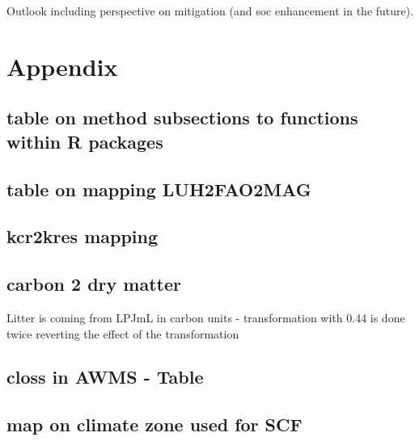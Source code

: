\documentclass[gc, manuscript]{copernicus}
\begin{document}
\conclusions

Outlook including perspective on mitigation (and soc enhancement in the
future). \newpage

\section{Appendix}

\hypertarget{append:subsection2mrfunctions}{%
\subsection{table on method subsections to functions within R
packages}\label{append:subsection2mrfunctions}}

\hypertarget{append:Tableluh2fao2mag}{%
\subsection{table on mapping
LUH2FAO2MAG}\label{append:Tableluh2fao2mag}}

\hypertarget{append:Tablekcr2kres}{%
\subsection{kcr2kres mapping}\label{append:Tablekcr2kres}}

\hypertarget{append:Tablec2dm}{%
\subsection{carbon 2 dry matter}\label{append:Tablec2dm}}

Litter is coming from LPJmL in carbon units - transformation with 0.44
is done twice reverting the effect of the transformation

\hypertarget{append:TableclossAWMS}{%
\subsection{closs in AWMS - Table}\label{append:TableclossAWMS}}

\hypertarget{append:climatemap}{%
\subsection{map on climate zone used for SCF}\label{append:climatemap}}

\newpage




\end{document}
